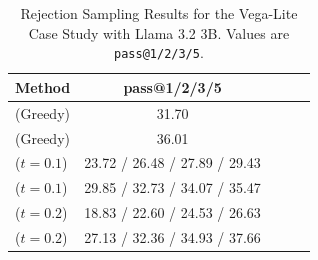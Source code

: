 \begin{table}[ht]
    \centering
    \scriptsize
    \caption{Rejection Sampling Results for the Vega-Lite Case Study with Llama 3.2 3B. Values are \texttt{pass@1/2/3/5}.}
    \begin{tabular}{lcccc}
        \toprule
        \textbf{Method} & \textbf{pass@1/2/3/5} \\
        \midrule
        \syncode{} (Greedy) & 31.70\\
        \Tool{} (Greedy) & 36.01 \\
        \standard{} ($t=0.1$) & 23.72 / 26.48 / 27.89 / 29.43 \\
        \syncode{} ($t=0.1$) & 29.85 / 32.73 / 34.07 / 35.47 \\
        \standard{} ($t=0.2$) & 18.83 / 22.60 / 24.53 / 26.63  \\
        \syncode{} ($t=0.2$) & 27.13 / 32.36 / 34.93 / 37.66 \\
        \bottomrule
    \end{tabular}
    \label{tab:vega_lite_rej}
\end{table}
